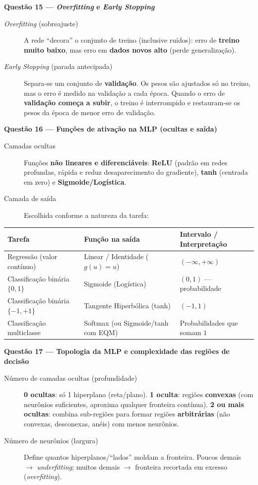 \documentclass[10pt,a4paper]{article}
\newcommand{\questao}[2]{%
  \needspace{4\baselineskip}%
  \vspace{0.45em}\noindent
  {\color{azulufersa}\bfseries Questão #1 --- #2}\par\nopagebreak\vspace{0.15em}\noindent\ignorespaces%
}
\begin{document}
\questao{15}{\emph{Overfitting} e \emph{Early Stopping}}
\begin{description}
  \item[\emph{Overfitting} (sobreajuste)] A rede \enquote{decora} o conjunto de treino (inclusive ruídos): erro de \textbf{treino muito baixo}, mas erro em \textbf{dados novos alto} (perde generalização).
  \item[\emph{Early Stopping} (parada antecipada)] Separa-se um conjunto de \textbf{validação}. Os pesos são ajustados só no treino, mas o erro é medido na validação a cada época. Quando o erro de \textbf{validação começa a subir}, o treino é interrompido e restauram-se os pesos da época de menor erro de validação.
\end{description}

\questao{16}{Funções de ativação na MLP (ocultas e saída)}
\begin{description}
  \item[Camadas ocultas] Funções \textbf{não lineares e diferenciáveis}: \textbf{ReLU} (padrão em redes profundas, rápida e reduz desaparecimento do gradiente), \textbf{tanh} (centrada em zero) e \textbf{Sigmoide/Logística}.
  \item[Camada de saída] Escolhida conforme a natureza da tarefa:
\end{description}

\begin{center}
\small
\begin{tabularx}{\linewidth}{@{} l l X @{}}
  \toprule
  \textbf{Tarefa} & \textbf{Função na saída} & \textbf{Intervalo / Interpretação} \\
  \midrule
  Regressão (valor contínuo) & Linear / Identidade ($g(u)=u$) & $(-\infty, +\infty)$ \\
  Classificação binária $\{0,1\}$ & Sigmoide (Logística) & $(0, 1)$ --- probabilidade \\
  Classificação binária $\{-1,+1\}$ & Tangente Hiperbólica (tanh) & $(-1, 1)$ \\
  Classificação multiclasse & Softmax (ou Sigmoide/tanh com EQM) & Probabilidades que somam $1$ \\
  \bottomrule
\end{tabularx}
\end{center}

\questao{17}{Topologia da MLP e complexidade das regiões de decisão}
\begin{description}
  \item[Número de camadas ocultas (profundidade)] \textbf{0 ocultas}: só 1 hiperplano (reta/plano). \textbf{1 oculta}: regiões \textbf{convexas} (com neurônios suficientes, aproxima qualquer fronteira contínua). \textbf{2 ou mais ocultas}: combina sub-regiões para formar regiões \textbf{arbitrárias} (não convexas, desconexas, anéis) com menos neurônios.
  \item[Número de neurônios (largura)] Define quantos hiperplanos/\enquote{lados} moldam a fronteira. Poucos demais $\to$ \emph{underfitting}; muitos demais $\to$ fronteira recortada em excesso (\emph{overfitting}).
\end{description}
\end{document}
